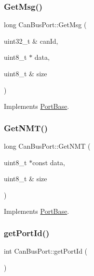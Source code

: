 \subsubsection{\texorpdfstring{Get\+Msg()}{GetMsg()}}
{\footnotesize\ttfamily long Can\+Bus\+Port\+::\+Get\+Msg (\begin{DoxyParamCaption}\item[{uint32\+\_\+t \&}]{can\+Id,  }\item[{uint8\+\_\+t $\ast$}]{data,  }\item[{uint8\+\_\+t \&}]{size }\end{DoxyParamCaption})\hspace{0.3cm}{\ttfamily [virtual]}}



Implements \hyperlink{classPortBase_a4fe82768f2b79889d7084292ac0e8696}{Port\+Base}.

\mbox{\label{classCanBusPort_a41242dc7980ca398e4770813e50ef32b}} 
\subsubsection{\texorpdfstring{Get\+N\+M\+T()}{GetNMT()}}
{\footnotesize\ttfamily long Can\+Bus\+Port\+::\+Get\+N\+MT (\begin{DoxyParamCaption}\item[{uint8\+\_\+t $\ast$const}]{data,  }\item[{uint8\+\_\+t \&}]{size }\end{DoxyParamCaption})\hspace{0.3cm}{\ttfamily [virtual]}}



Implements \hyperlink{classPortBase_abab2bf17b01d87c2bca01cb2151aa2f1}{Port\+Base}.

\mbox{\label{classCanBusPort_a7c6b733c5834d4ab3e1906d847a2234a}} 
\subsubsection{\texorpdfstring{get\+Port\+Id()}{getPortId()}}
{\footnotesize\ttfamily int Can\+Bus\+Port\+::get\+Port\+Id (\begin{DoxyParamCaption}{ }\end{DoxyParamCaption})}

